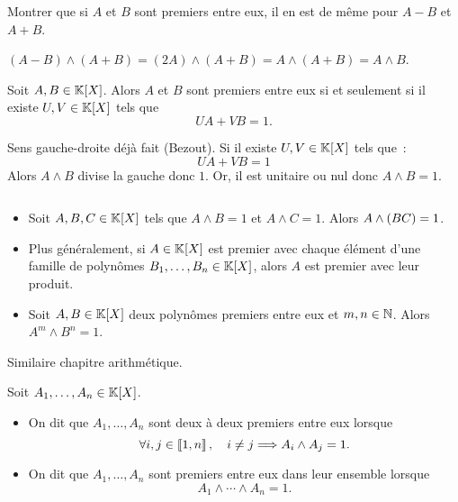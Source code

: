 \documentclass{magnolia}
\begin{document}
\begin{exoUnique}
\exo Montrer que si $A$ et $B$ sont premiers entre eux, il en est de même
  pour $A-B$ et $A+B$.
  \begin{sol}
  $(A-B)\wedge (A+B)=(2A)\wedge (A+B)=A\wedge (A+B)=A\wedge B$.
  \end{sol}
\end{exoUnique}

\begin{proposition}
Soit $A,B\in\polyK$. Alors $A$ et $B$ sont premiers entre eux si et seulement
si il existe $U,V\in\polyK$ tels que
\[UA+VB=1.\]
\end{proposition}

\begin{preuve}
Sens gauche-droite déjà fait (Bezout).
Si il existe $U,V\in\polyK$ tels que~:
\[UA+VB=1\]
Alors $A\wedge B$ divise la gauche donc $1$. Or, il est unitaire ou nul donc $A\wedge B=1$.
\end{preuve}

\begin{proposition}
$\quad$
\begin{itemize}
\item Soit $A,B,C\in\polyK$ tels que $A\wedge B=1$ et $A\wedge C=1$. Alors
  $A\wedge \left(BC\right)=1$.
\item Plus généralement, si $A\in\polyK$ est premier avec chaque élément d'une
  famille de polynômes $B_1,\ldots,B_n\in\polyK$, alors $A$ est premier avec leur
  produit.
\item Soit $A,B\in\polyK$ deux polynômes premiers entre eux et $m,n\in\mathbb{N}$. Alors
  $A^m\wedge B^n=1$.
\end{itemize}
\end{proposition}

\begin{preuve}
Similaire chapitre arithmétique.
\end{preuve}


\begin{definition}
Soit $A_1,\ldots,A_n\in\polyK$.
\begin{itemize}
\item On dit que $A_1,\ldots,A_n$ sont deux à deux premiers entre eux lorsque
  \[\forall i,j\in\left\llbracket 1,n\right\rrbracket ,\quad i\neq j \Longrightarrow A_i\wedge A_j=1.\]
\item On dit que $A_1,\ldots,A_n$ sont premiers entre eux dans leur ensemble lorsque
  \[A_1\wedge\cdots\wedge A_n=1.\]
\end{itemize}
\end{definition}
\end{document}
